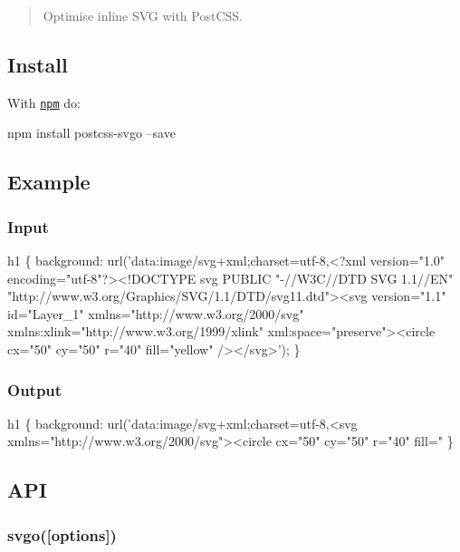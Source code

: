 \begin{quote}
Optimise inline S\+VG with Post\+C\+SS. \end{quote}


\subsection*{Install}

With \href{https://npmjs.org/package/postcss-svgo}{\tt npm} do\+:


\begin{DoxyCode}
npm install postcss-svgo --save
\end{DoxyCode}


\subsection*{Example}

\subsubsection*{Input}


\begin{DoxyCode}
h1 \{
    background: url('data:image/svg+xml;charset=utf-8,<?xml version="1.0" encoding="utf-8"?><!DOCTYPE svg
       PUBLIC "-//W3C//DTD SVG 1.1//EN" "http://www.w3.org/Graphics/SVG/1.1/DTD/svg11.dtd"><svg version="1.1"
       id="Layer\_1" xmlns="http://www.w3.org/2000/svg" xmlns:xlink="http://www.w3.org/1999/xlink"
       xml:space="preserve"><circle cx="50" cy="50" r="40" fill="yellow" /></svg>');
\}
\end{DoxyCode}


\subsubsection*{Output}


\begin{DoxyCode}
h1 \{
    background: url('data:image/svg+xml;charset=utf-8,<svg xmlns="http://www.w3.org/2000/svg"><circle
       cx="50" cy="50" r="40" fill="%
\}
\end{DoxyCode}


\subsection*{A\+PI}

\subsubsection*{{\ttfamily svgo(\mbox{[}options\mbox{]})}}

